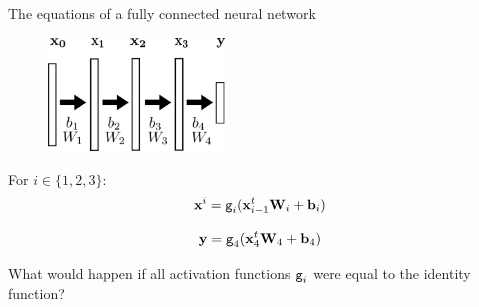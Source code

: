\documentclass[xcolor=pdftex,dvipsnames,table,mathserif]{beamer}
\begin{document}
\begin{frame}{The equations of a fully connected neural network}

  \begin{figure}
    \includegraphics[height=3cm]{nn_representation2}
  \end{figure}

  \begin{block}{}
    For $i \in \{1, 2, 3\}$:
    \[\mathbf{x}^i = \texttt{g}_i(\mathbf{x}_{i-1}^t \mathbf{W}_i + \mathbf{b}_i)\]
  \end{block}
  \begin{block}{}
    \[\mathbf{y} = \texttt{g}_4(\mathbf{x}_4^t \mathbf{W}_4 + \mathbf{b}_4)\]
  \end{block}

  \pause

  What would happen if all activation functions $\texttt{g}_i$ were equal to the identity function?

\end{frame}
\end{document}
